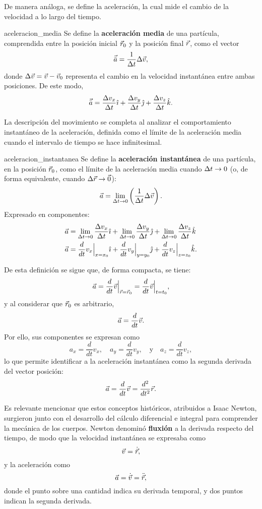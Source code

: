De manera análoga, se define la aceleración, la cual mide el cambio de la velocidad a lo largo del tiempo.

\begin{definition}{}{aceleracion_media}
    Se define la \textbf{aceleración media} de una partícula, comprendida entre la posición inicial $\vec{r}_0$ y la posición final $\vec{r}$, como el vector
    $$\vec{\bar{a}} = \frac{1}{\Delta t}\Delta\vec{v},$$
    donde $\Delta\vec{v} = \vec{v} - \vec{v}_0$ representa el cambio en la velocidad instantánea entre ambas posiciones. De este modo,
    $$\vec{\bar{a}} = \frac{\Delta v_x}{\Delta t}\hat{\imath} + \frac{\Delta v_y}{\Delta t}\hat{\jmath} + \frac{\Delta v_z}{\Delta t}\hat{k}.$$
\end{definition}

La descripción del movimiento se completa al analizar el comportamiento instantáneo de la aceleración, definida como el límite de la aceleración media cuando el intervalo de tiempo se hace infinitesimal.

\begin{definition}{}{aceleracion_instantanea}
    Se define la \textbf{aceleración instantánea} de una partícula, en la posición $\vec{r}_0$, como el límite de la aceleración media cuando $\Delta t \to 0$ (o, de forma equivalente, cuando $\Delta\vec{r} \to \vec{0}$):
    $$\vec{a} = \lim_{\Delta t \to 0}\left(\frac{1}{\Delta t}\Delta\vec{v}\right).$$
    Expresado en componentes:
    \begin{align*}
        \vec{a} & = \lim_{\Delta t \to 0}\frac{\Delta v_x}{\Delta t}\hat{\imath} + \lim_{\Delta t \to 0}\frac{\Delta v_y}{\Delta t}\hat{\jmath} + \lim_{\Delta t \to 0}\frac{\Delta v_z}{\Delta t}\hat{k} \\
        \vec{a} & = \frac{d}{dt}v_x\Big|_{x = x_0}\hat{\imath} + \frac{d}{dt}v_y\Big|_{y = y_0}\hat{\jmath} + \frac{d}{dt}v_z\Big|_{z = z_0}\hat{k}.
    \end{align*}
\end{definition}

De esta definición se sigue que, de forma compacta, se tiene:
$$\vec{a} = \frac{d}{dt}\vec{v}\Big|_{\vec{r} = \vec{r}_0} = \frac{d}{dt}\vec{v}\Big|_{t = t_0},$$
y al considerar que $\vec{r}_0$ es arbitrario,
$$\vec{a} = \frac{d}{dt}\vec{v}.$$
Por ello, sus componentes se expresan como
$$a_x = \frac{d}{dt}v_x,\quad a_y = \frac{d}{dt}v_y,\quad \text{y} \quad a_z = \frac{d}{dt}v_z,$$
lo que permite identificar a la aceleración instantánea como la segunda derivada del vector posición:
$$\vec{a} = \frac{d}{dt}\vec{v} = \frac{d^2}{dt^2}\vec{r}.$$

Es relevante mencionar que estos conceptos históricos, atribuidos a Isaac Newton, surgieron junto con el desarrollo del cálculo diferencial e integral para comprender la mecánica de los cuerpos. Newton denominó \textbf{fluxión} a la derivada respecto del tiempo, de modo que la velocidad instantánea se expresaba como
$$\vec{v} = \dot{\vec{r}},$$
y la aceleración como
$$\vec{a} = \dot{\vec{v}} = \ddot{\vec{r}},$$
donde el punto sobre una cantidad indica su derivada temporal, y dos puntos indican la segunda derivada.

